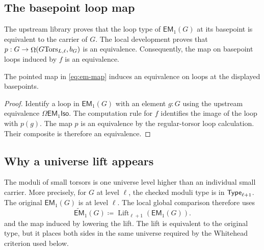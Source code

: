 \subsection{The basepoint loop map}
The upstream library proves that the loop type of $\mathsf{EM}_1(G)$ at its basepoint is equivalent to the carrier of $G$. The local development proves that $p:G\to \mathop{\Omega}(G\mathrm{Tors}_{L,\ell},b_G)$ is an equivalence. Consequently, the map on basepoint loops induced by $f$ is an equivalence.

\begin{proposition}
The pointed map in \eqref{eq:em-map} induces an equivalence on loops at the displayed basepoints.
\end{proposition}
\begin{proof}
Identify a loop in $\mathsf{EM}_1(G)$ with an element $g:G$ using the upstream equivalence $\Omega\mathsf{EM}_1\mathsf{Iso}$. The computation rule for $f$ identifies the image of the loop with $p(g)$. The map $p$ is an equivalence by the regular-torsor loop calculation. Their composite is therefore an equivalence.
\end{proof}


\subsection{Why a universe lift appears}
The moduli of small torsors is one universe level higher than an individual small carrier. More precisely, for $G$ at level $\ell$, the checked moduli type is in $\mathsf{Type}_{\ell+1}$. The original $\mathsf{EM}_1(G)$ is at level $\ell$. The local global comparison therefore uses
\begin{equation}
\widetilde{\mathsf{EM}}_1(G)\coloneqq\operatorname{Lift}_{\ell+1}(\mathsf{EM}_1(G)).
\label{eq:lifted-em}
\end{equation}
and the map induced by lowering the lift. The lift is equivalent to the original type, but it places both sides in the same universe required by the Whitehead criterion used below.


